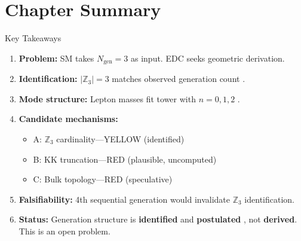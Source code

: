 \section{Chapter Summary}
\label{sec:gen_chapter_summary}

\begin{statusbox}{Key Takeaways}
\begin{enumerate}
\item \textbf{Problem:} SM takes $N_{\text{gen}} = 3$ as input. EDC seeks geometric derivation.

\item \textbf{Identification:} $|\mathbb{Z}_3| = 3$ matches observed generation count \tagI{}.

\item \textbf{Mode structure:} Lepton masses fit tower with $n = 0, 1, 2$ \tagI{}.

\item \textbf{Candidate mechanisms:}
      \begin{itemize}[nosep]
          \item A: $\mathbb{Z}_3$ cardinality---YELLOW (identified)
          \item B: KK truncation---RED (plausible, uncomputed)
          \item C: Bulk topology---RED (speculative)
      \end{itemize}

\item \textbf{Falsifiability:} 4th sequential generation would invalidate $\mathbb{Z}_3$ identification.

\item \textbf{Status:} Generation structure is \textbf{identified} \tagI{} and
      \textbf{postulated} \tagP{}, not \textbf{derived}. This is an open problem.
\end{enumerate}
\end{statusbox}

